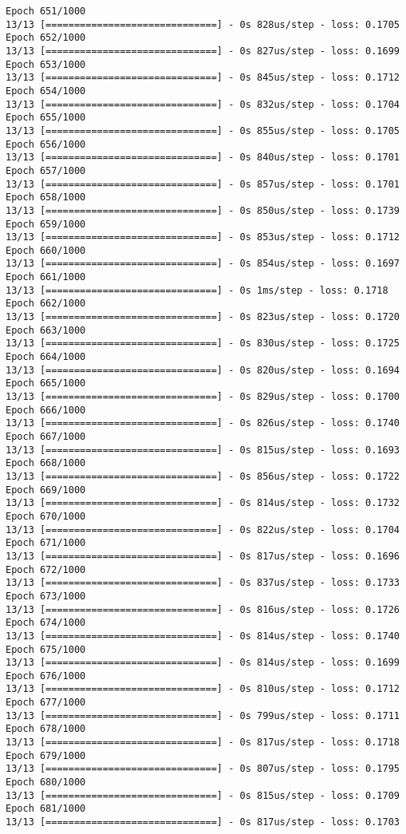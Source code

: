 \documentclass[11pt]{article}
\begin{document}
\begin{Verbatim}[commandchars=\\\{\}]
Epoch 651/1000
13/13 [==============================] - 0s 828us/step - loss: 0.1705
Epoch 652/1000
13/13 [==============================] - 0s 827us/step - loss: 0.1699
Epoch 653/1000
13/13 [==============================] - 0s 845us/step - loss: 0.1712
Epoch 654/1000
13/13 [==============================] - 0s 832us/step - loss: 0.1704
Epoch 655/1000
13/13 [==============================] - 0s 855us/step - loss: 0.1705
Epoch 656/1000
13/13 [==============================] - 0s 840us/step - loss: 0.1701
Epoch 657/1000
13/13 [==============================] - 0s 857us/step - loss: 0.1701
Epoch 658/1000
13/13 [==============================] - 0s 850us/step - loss: 0.1739
Epoch 659/1000
13/13 [==============================] - 0s 853us/step - loss: 0.1712
Epoch 660/1000
13/13 [==============================] - 0s 854us/step - loss: 0.1697
Epoch 661/1000
13/13 [==============================] - 0s 1ms/step - loss: 0.1718
Epoch 662/1000
13/13 [==============================] - 0s 823us/step - loss: 0.1720
Epoch 663/1000
13/13 [==============================] - 0s 830us/step - loss: 0.1725
Epoch 664/1000
13/13 [==============================] - 0s 820us/step - loss: 0.1694
Epoch 665/1000
13/13 [==============================] - 0s 829us/step - loss: 0.1700
Epoch 666/1000
13/13 [==============================] - 0s 826us/step - loss: 0.1740
Epoch 667/1000
13/13 [==============================] - 0s 815us/step - loss: 0.1693
Epoch 668/1000
13/13 [==============================] - 0s 856us/step - loss: 0.1722
Epoch 669/1000
13/13 [==============================] - 0s 814us/step - loss: 0.1732
Epoch 670/1000
13/13 [==============================] - 0s 822us/step - loss: 0.1704
Epoch 671/1000
13/13 [==============================] - 0s 817us/step - loss: 0.1696
Epoch 672/1000
13/13 [==============================] - 0s 837us/step - loss: 0.1733
Epoch 673/1000
13/13 [==============================] - 0s 816us/step - loss: 0.1726
Epoch 674/1000
13/13 [==============================] - 0s 814us/step - loss: 0.1740
Epoch 675/1000
13/13 [==============================] - 0s 814us/step - loss: 0.1699
Epoch 676/1000
13/13 [==============================] - 0s 810us/step - loss: 0.1712
Epoch 677/1000
13/13 [==============================] - 0s 799us/step - loss: 0.1711
Epoch 678/1000
13/13 [==============================] - 0s 817us/step - loss: 0.1718
Epoch 679/1000
13/13 [==============================] - 0s 807us/step - loss: 0.1795
Epoch 680/1000
13/13 [==============================] - 0s 815us/step - loss: 0.1709
Epoch 681/1000
13/13 [==============================] - 0s 817us/step - loss: 0.1703

\end{Verbatim}
\end{document}
